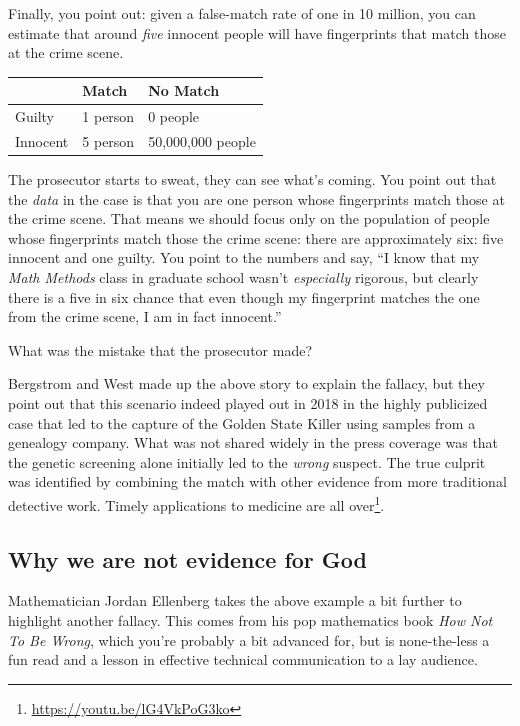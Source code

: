 Finally, you point out: given a false-match rate of one in 10 million, you can estimate that around \emph{five} innocent people will have fingerprints that match those at the crime scene. 
\begin{center}
\begin{tabular}{l|ll} \toprule %
		& Match & No Match
		\\ \hline
		Guilty & {1 person} & {0 people}
		\\
		Innocent & {5 person} & {50,000,000 people}
		\\ \bottomrule
\end{tabular}
\end{center}
The prosecutor starts to sweat, they can see what's coming. You point out that the \emph{data} in the case is that you are one person whose fingerprints match those at the crime scene. That means we should focus only on the population of people whose fingerprints match those the crime scene: there are approximately six: five innocent and one guilty. You point to the numbers and say, ``I know that my \emph{Math Methods} class in graduate school wasn't \emph{especially} rigorous, but clearly there is a five in six chance that even though my fingerprint matches the one from the crime scene, I am in fact innocent.''
\begin{exercise}
What was the mistake that the prosecutor made?
\end{exercise}
Bergstrom and West made up the above story to explain the fallacy, but they point out that this scenario indeed played out in 2018 in the highly publicized case that led to the capture of the Golden State Killer using  samples from a genealogy company. What was not shared widely in the press coverage was that the genetic screening alone initially led to the \emph{wrong} suspect. The true culprit was identified by combining the  match with other evidence from more traditional detective work. Timely applications to medicine are all over\footnote{\url{https://youtu.be/lG4VkPoG3ko}}.

\subsection{Why we are not evidence for God}

Mathematician Jordan Ellenberg takes the above example a bit further to highlight another fallacy. This comes from his pop mathematics book \emph{How Not To Be Wrong}, which you're probably a bit advanced for, but is none-the-less a fun read and a lesson in effective technical communication to a lay audience. 

